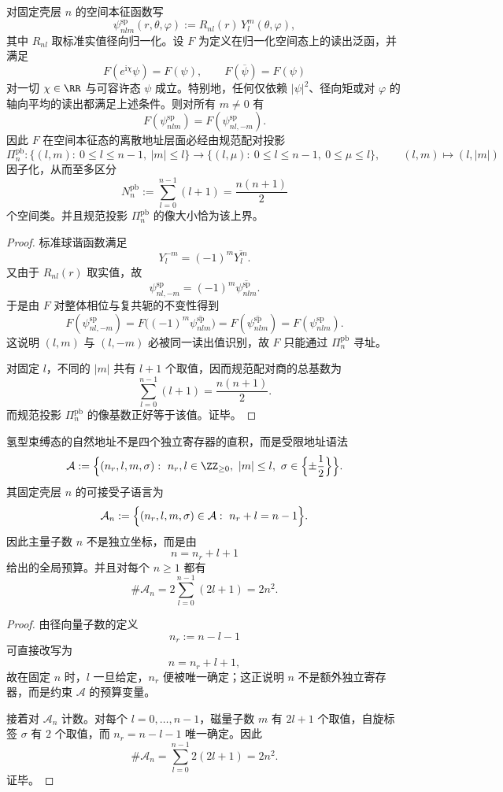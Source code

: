 \begin{theorem}[相位盲读出的共轭配对塌缩律]\label{thm:conclusion-hydrogenic-phaseblind-pair-collapse}
对固定壳层 \(n\) 的空间本征函数写
\[
\psi_{nlm}^{\mathrm{sp}}(r,\theta,\varphi)
:=
R_{nl}(r)\,Y_l^m(\theta,\varphi),
\]
其中 \(R_{nl}\) 取标准实值径向归一化。设 \(F\) 为定义在归一化空间态上的读出泛函，并满足
\[
F(e^{\mathrm{i}\chi}\psi)=F(\psi),
\qquad
F(\overline{\psi})=F(\psi)
\]
对一切 \(\chi\in\RR\) 与可容许态 \(\psi\) 成立。特别地，任何仅依赖 \(|\psi|^2\)、径向矩或对 \(\varphi\) 的轴向平均的读出都满足上述条件。则对所有 \(m\neq 0\) 有
\[
F(\psi_{nlm}^{\mathrm{sp}})
=
F(\psi_{nl,-m}^{\mathrm{sp}}).
\]
因此 \(F\) 在空间本征态的离散地址层面必经由规范配对投影
\[
\Pi_n^{\mathrm{pb}}:
\{(l,m):\ 0\le l\le n-1,\ |m|\le l\}
\longrightarrow
\{(l,\mu):\ 0\le l\le n-1,\ 0\le \mu\le l\},
\qquad
(l,m)\longmapsto (l,|m|)
\]
因子化，从而至多区分
\[
N_n^{\mathrm{pb}}
:=
\sum_{l=0}^{n-1}(l+1)
=
\frac{n(n+1)}{2}
\]
个空间类。并且规范投影 \(\Pi_n^{\mathrm{pb}}\) 的像大小恰为该上界。
\end{theorem}
\begin{proof}
标准球谐函数满足
\[
Y_l^{-m}=(-1)^m\overline{Y_l^m}.
\]
又由于 \(R_{nl}(r)\) 取实值，故
\[
\psi_{nl,-m}^{\mathrm{sp}}
=
(-1)^m\overline{\psi_{nlm}^{\mathrm{sp}}}.
\]
于是由 \(F\) 对整体相位与复共轭的不变性得到
\[
F(\psi_{nl,-m}^{\mathrm{sp}})
=
F\bigl((-1)^m\overline{\psi_{nlm}^{\mathrm{sp}}}\bigr)
=
F(\overline{\psi_{nlm}^{\mathrm{sp}}})
=
F(\psi_{nlm}^{\mathrm{sp}}).
\]
这说明 \((l,m)\) 与 \((l,-m)\) 必被同一读出值识别，故 \(F\) 只能通过 \(\Pi_n^{\mathrm{pb}}\) 寻址。

对固定 \(l\)，不同的 \(|m|\) 共有 \(l+1\) 个取值，因而规范配对商的总基数为
\[
\sum_{l=0}^{n-1}(l+1)=\frac{n(n+1)}{2}.
\]
而规范投影 \(\Pi_n^{\mathrm{pb}}\) 的像基数正好等于该值。证毕。
\end{proof}

\begin{proposition}[氢型量子数的受限语法与壳层预算律]\label{prop:conclusion-hydrogenic-address-grammar}
氢型束缚态的自然地址不是四个独立寄存器的直积，而是受限地址语法
\[
\mathcal A
:=
\Bigl\{
(n_r,l,m,\sigma):
\ n_r,l\in\ZZ_{\ge 0},\
|m|\le l,\
\sigma\in\Bigl\{\pm\frac12\Bigr\}
\Bigr\}.
\]
其固定壳层 \(n\) 的可接受子语言为
\[
\mathcal A_n
:=
\Bigl\{
(n_r,l,m,\sigma)\in \mathcal A:
\ n_r+l=n-1
\Bigr\}.
\]
因此主量子数 \(n\) 不是独立坐标，而是由
\[
n=n_r+l+1
\]
给出的全局预算。并且对每个 \(n\ge 1\) 都有
\[
\#\mathcal A_n
=
2\sum_{l=0}^{n-1}(2l+1)
=
2n^2.
\]
\end{proposition}
\begin{proof}
由径向量子数的定义
\[
n_r:=n-l-1
\]
可直接改写为
\[
n=n_r+l+1,
\]
故在固定 \(n\) 时，\(l\) 一旦给定，\(n_r\) 便被唯一确定；这正说明 \(n\) 不是额外独立寄存器，而是约束 \(\mathcal A\) 的预算变量。

接着对 \(\mathcal A_n\) 计数。对每个 \(l=0,\dots,n-1\)，磁量子数 \(m\) 有 \(2l+1\) 个取值，自旋标签 \(\sigma\) 有 \(2\) 个取值，而 \(n_r=n-l-1\) 唯一确定。因此
\[
\#\mathcal A_n
=
\sum_{l=0}^{n-1}2(2l+1)
=
2n^2.
\]
证毕。
\end{proof}

